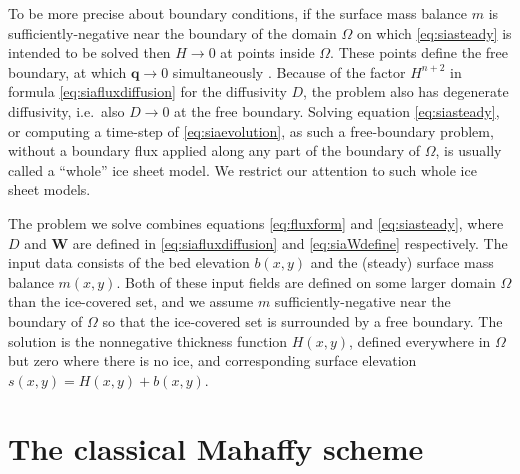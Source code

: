 \documentclass[twocolumn,letterpaper]{igs}
\newcommand\bq{\mathbf{q}}
\newcommand\bW{\mathbf{W}}
\begin{document}
To be more precise about boundary conditions, if the surface mass balance $m$ is sufficiently-negative near the boundary of the domain $\Omega$ on which \eqref{eq:siasteady} is intended to be solved then $H\to 0$ at points inside $\Omega$.  These points define the free boundary, at which $\bq \to 0$ simultaneously \citep{JouvetBueler2012}.  Because of the factor $H^{n+2}$ in formula \eqref{eq:siafluxdiffusion} for the diffusivity $D$, the problem also has degenerate diffusivity, i.e.~also $D \to 0$ at the free boundary.  Solving equation \eqref{eq:siasteady}, or computing a time-step of \eqref{eq:siaevolution}, as such a free-boundary problem, without a boundary flux applied along any part of the boundary of $\Omega$, is usually called a ``whole'' ice sheet model.  We restrict our attention to such whole ice sheet models.

The problem we solve combines equations \eqref{eq:fluxform} and \eqref{eq:siasteady}, where $D$ and $\bW$ are defined in \eqref{eq:siafluxdiffusion} and \eqref{eq:siaWdefine} respectively.  The input data consists of the bed elevation $b(x,y)$ and the (steady) surface mass balance $m(x,y)$.  Both of these input fields are defined on some larger domain $\Omega$ than the ice-covered set, and we assume $m$ sufficiently-negative near the boundary of $\Omega$ so that the ice-covered set is surrounded by a free boundary.  The solution is the nonnegative thickness function $H(x,y)$, defined everywhere in $\Omega$ but zero where there is no ice, and corresponding surface elevation $s(x,y)=H(x,y)+b(x,y)$.


\section{The classical Mahaffy scheme}   \label{sec:mahaffyfd}
\end{document}
